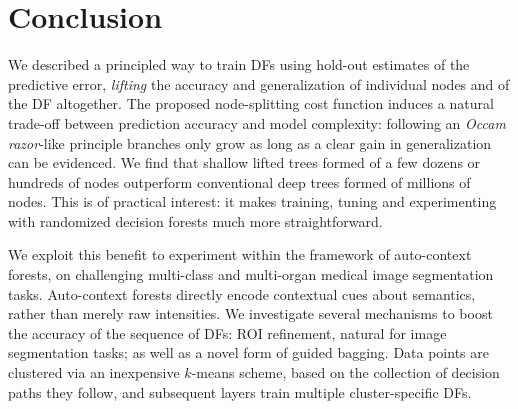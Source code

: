 
\section{Conclusion}
\label{sec:conc}

We described a principled way to train DFs using hold-out estimates of the predictive error, \textit{lifting} the accuracy and generalization of individual nodes and of the DF altogether. The proposed node-splitting cost function induces a natural trade-off between prediction accuracy and model complexity: following an \textit{Occam razor}-like principle branches only grow as long as a clear gain in generalization can be evidenced. %
We find that shallow lifted trees formed of a few dozens or hundreds of nodes outperform conventional deep trees formed of millions of nodes. This is of practical interest: it makes training, tuning and experimenting with randomized decision forests much more straightforward. 

We exploit this benefit to experiment within the framework of auto-context forests, on challenging multi-class and multi-organ medical image segmentation tasks. Auto-context forests directly encode contextual cues about semantics, rather than merely raw intensities. We investigate several mechanisms to boost the accuracy of the sequence of DFs: ROI refinement, natural for image segmentation tasks; as well as a novel form of guided bagging. Data points are clustered via an inexpensive $k$-means scheme, based on the collection of decision paths they follow, and subsequent layers train multiple cluster-specific DFs.%

